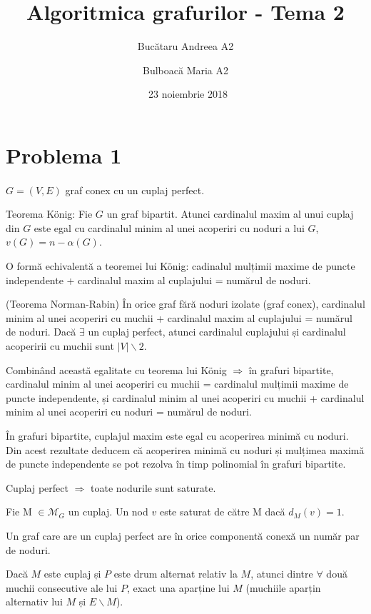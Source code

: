 \documentclass[paper=a4, fontsize=12pt]{scrartcl}
\title{\textbf{Algoritmica grafurilor - Tema 2}}
\author{Bucătaru Andreea A2 \and Bulboacă Maria A2}
\date{\normalsize\ 23 noiembrie 2018}
\begin{document}
\maketitle

\section*{Problema 1}
\paragraph{}
$G = (V, E)$ graf conex cu un cuplaj perfect.

Teorema König: Fie $G$ un graf bipartit. Atunci cardinalul maxim al unui cuplaj din $G$ este egal cu cardinalul minim al unei acoperiri cu noduri 
a lui $G$, $\mathit{v}(G) = n - \alpha(G)$.

O formă echivalentă a teoremei lui König: cadinalul mulțimii maxime de puncte independente + cardinalul maxim al cuplajului = numărul de noduri.

(Teorema Norman-Rabin) În orice graf fără noduri izolate (graf conex), cardinalul minim al unei acoperiri cu muchii + cardinalul maxim al cuplajului = 
numărul de noduri. Dacă $\exists$ un cuplaj perfect, atunci cardinalul cuplajului și cardinalul acoperirii cu muchii sunt $|V| \backslash 2$.

Combinând această egalitate cu teorema lui König $\Rightarrow$ în grafuri bipartite, cardinalul minim al unei acoperiri cu muchii = cardinalul mulțimii
maxime de puncte independente, și cardinalul minim al unei acoperiri cu muchii + cardinalul minim al unei acoperiri cu noduri = numărul de noduri.

În grafuri bipartite, cuplajul maxim este egal cu acoperirea minimă cu noduri. Din acest rezultate deducem că acoperirea minimă cu noduri și mulțimea maximă
de puncte independente se pot rezolva în timp polinomial în grafuri bipartite.

Cuplaj perfect $\Rightarrow$ toate nodurile sunt saturate.

Fie M $\in \mathcal{M}_G$ un cuplaj. Un nod $v$ este saturat de către M dacă $d_M(v) = 1$.

Un graf care are un cuplaj perfect are în orice componentă conexă un număr par de noduri.

Dacă $M$ este cuplaj și $P$ este drum alternat relativ la $M$, atunci dintre $\forall$ două muchii consecutive ale lui $P$, exact una aparține lui $M$
(muchiile aparțin alternativ lui $M$ și $E \backslash M$).
\end{document}
